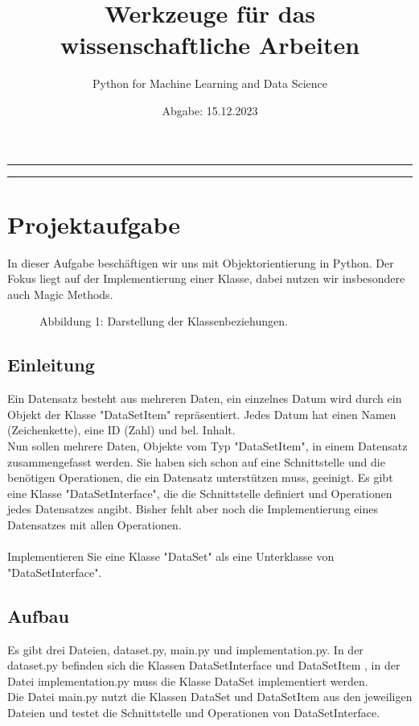 \documentclass{article}
\title{\bf \Large Werkzeuge für das wissenschaftliche Arbeiten}
\author{Python for Machine Learning and Data Science}
\date{Abgabe: 15.12.2023}
\begin{document}
\maketitle
\hrule
\tableofcontents
\hrule
\section{Projektaufgabe}
In dieser Aufgabe beschäftigen wir uns mit Objektorientierung in Python. Der Fokus liegt auf der Implementierung einer Klasse, dabei nutzen wir insbesondere auch Magic Methods.
\begin{figure}
    \centering
    
    \caption{Abbildung 1: \normalfont Darstellung der Klassenbeziehungen.}
    \label{fig:enter-label}
\end{figure}
\subsection{Einleitung}
Ein Datensatz besteht aus mehreren Daten, ein einzelnes Datum wird durch ein Objekt der Klasse "DataSetItem" repräsentiert.
Jedes Datum hat einen Namen (Zeichenkette), eine ID (Zahl) und bel. Inhalt.\\
Nun sollen mehrere Daten, Objekte vom Typ "DataSetItem", in einem Datensatz zusammengefasst werden.
Sie haben sich schon auf eine Schnittstelle und die benötigen Operationen, die ein Datensatz unterstützen muss, geeinigt.
Es gibt eine Klasse "DataSetInterface", die die Schnittstelle definiert und Operationen jedes Datensatzes angibt.
Bisher fehlt aber noch die Implementierung eines Datensatzes mit allen Operationen.\\
\\
Implementieren Sie eine Klasse "DataSet" als eine Unterklasse von "DataSetInterface".\\
\subsection{Aufbau}
Es gibt drei Dateien, \dq dataset.py\dq{}, \dq main.py\dq{} und \dq implementation.py\dq{}. In der \dq dataset.py\dq{} befinden sich die Klassen \dq DataSetInterface\dq{} und \dq DataSetItem\dq{} , in der Datei \dq implementation.py\dq{} muss die Klasse \dq DataSet\dq{} implementiert werden.\\
Die Datei \dq main.py\dq{} nutzt die Klassen \dq DataSet\dq{} und \dq DataSetItem\dq{} aus den jeweiligen Dateien und testet die Schnittstelle und Operationen von \dq DataSetInterface\dq{}.
\end{document}
